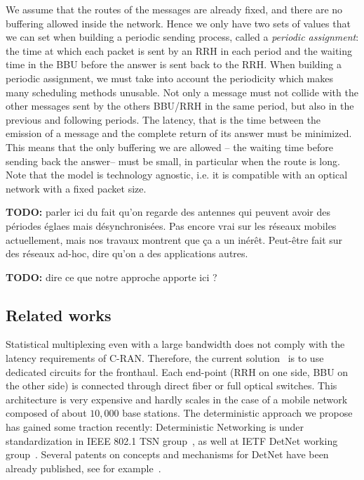 \documentclass[10pt, conference, letterpaper]{IEEEtran}
\begin{document}
We assume that the routes of the messages are already fixed, and there are no buffering allowed inside the network. Hence we only have two sets of values that we can set when building a periodic sending process, called a \emph{periodic assignment}: the time at which each packet is sent by an RRH in each period and the waiting time in the BBU before the answer is sent back to the RRH. When building a periodic assignment, we must take into account the periodicity which makes many scheduling methods unusable. Not only a message must not collide with the other messages sent by the others BBU/RRH in the same period, but also in the previous and following periods. The latency, that is the time between the emission of a message and the complete return of its answer must be minimized. This means that the only buffering we are allowed -- the waiting time before sending back the answer-- must be small, in particular when the route is long. Note that the model is technology agnostic, i.e. it is compatible with an optical network with a fixed packet size.   

\textbf{TODO:} parler ici du fait qu'on regarde des antennes qui peuvent avoir des périodes églaes mais désynchronisées. Pas encore vrai sur les réseaux mobiles actuellement, mais nos travaux montrent que ça a un inérêt. Peut-être fait sur des réseaux ad-hoc, dire qu'on a des applications autres.

\textbf{TODO:} dire ce que notre approche apporte ici ?

 \subsection*{Related works}

 Statistical multiplexing even with a large bandwidth does not comply with the latency requirements of C-RAN. Therefore, the current solution~\cite{pizzinat2015things,tayq2017real} is to use dedicated circuits for the fronthaul. Each end-point (RRH on one side, BBU on the other side) is connected through direct fiber or full optical switches. This architecture is very expensive and hardly scales in the case of a mobile network composed of about $10,000$ base stations. The deterministic approach we propose has gained some traction recently: Deterministic Networking is under standardization in IEEE 802.1 TSN group~\cite{finn-detnet-architecture-08}, as well at IETF DetNet working group~\cite{ieee802}. Several patents on concepts and mechanisms for DetNet have been already published, see for example~\cite{howe2005time,leclerc2016transmission}. 
     
\end{document}
